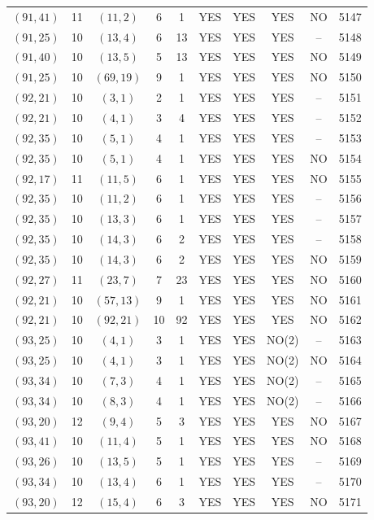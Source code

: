 \begin{longtable}{|c|c|c|c|c|c|c|c|c|c|}
$(91, 41)$ & 11 & $(11, 2)$ & 6 & 1 & YES & YES & YES & NO & 5147\\
$(91, 25)$ & 10 & $(13, 4)$ & 6 & 13 & YES & YES & YES & -- & 5148\\
$(91, 40)$ & 10 & $(13, 5)$ & 5 & 13 & YES & YES & YES & NO & 5149\\
$(91, 25)$ & 10 & $(69, 19)$ & 9 & 1 & YES & YES & YES & NO & 5150\\
$(92, 21)$ & 10 & $(3, 1)$ & 2 & 1 & YES & YES & YES & -- & 5151\\
$(92, 21)$ & 10 & $(4, 1)$ & 3 & 4 & YES & YES & YES & -- & 5152\\
$(92, 35)$ & 10 & $(5, 1)$ & 4 & 1 & YES & YES & YES & -- & 5153\\
$(92, 35)$ & 10 & $(5, 1)$ & 4 & 1 & YES & YES & YES & NO & 5154\\
$(92, 17)$ & 11 & $(11, 5)$ & 6 & 1 & YES & YES & YES & NO & 5155\\
$(92, 35)$ & 10 & $(11, 2)$ & 6 & 1 & YES & YES & YES & -- & 5156\\
$(92, 35)$ & 10 & $(13, 3)$ & 6 & 1 & YES & YES & YES & -- & 5157\\
$(92, 35)$ & 10 & $(14, 3)$ & 6 & 2 & YES & YES & YES & -- & 5158\\
$(92, 35)$ & 10 & $(14, 3)$ & 6 & 2 & YES & YES & YES & NO & 5159\\
$(92, 27)$ & 11 & $(23, 7)$ & 7 & 23 & YES & YES & YES & NO & 5160\\
$(92, 21)$ & 10 & $(57, 13)$ & 9 & 1 & YES & YES & YES & NO & 5161\\
$(92, 21)$ & 10 & $(92, 21)$ & 10 & 92 & YES & YES & YES & NO & 5162\\
$(93, 25)$ & 10 & $(4, 1)$ & 3 & 1 & YES & YES & NO(2) & -- & 5163\\
$(93, 25)$ & 10 & $(4, 1)$ & 3 & 1 & YES & YES & NO(2) & NO & 5164\\
$(93, 34)$ & 10 & $(7, 3)$ & 4 & 1 & YES & YES & NO(2) & -- & 5165\\
$(93, 34)$ & 10 & $(8, 3)$ & 4 & 1 & YES & YES & NO(2) & -- & 5166\\
$(93, 20)$ & 12 & $(9, 4)$ & 5 & 3 & YES & YES & YES & NO & 5167\\
$(93, 41)$ & 10 & $(11, 4)$ & 5 & 1 & YES & YES & YES & NO & 5168\\
$(93, 26)$ & 10 & $(13, 5)$ & 5 & 1 & YES & YES & YES & -- & 5169\\
$(93, 34)$ & 10 & $(13, 4)$ & 6 & 1 & YES & YES & YES & -- & 5170\\
$(93, 20)$ & 12 & $(15, 4)$ & 6 & 3 & YES & YES & YES & NO & 5171\\

\end{longtable}
